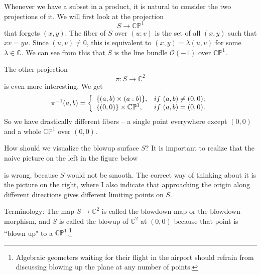 \documentclass[11pt]{article}
\numberwithin{equation}{section}
\numberwithin{footnote}{section}
\newcommand{\blue}{\color{blue}}
\renewcommand{\P}{{\mathbb P}}
\newcommand{\C}{{\mathbb C}}
\begin{document}
Whenever we have a subset in a product, it is natural to consider the two projections of it. We will first look at the projection 
$$
S\to \C\P^1
$$
that forgets $(x,y)$. The fiber of $S$ over $(u:v)$ is the set of all $(x,y)$ such that $xv=yu$. Since $(u,v)\neq 0$, this is 
equivalent to $(x,y) = \lambda (u,v)$ for some $\lambda \in \C$. We can see from this that $S$ is the line bundle $\mathcal O(-1)$ over $\C\P^1$.

\smallskip
The other projection
$$
\pi:S\to\C^2
$$
is even more interesting. We get
$$
\pi^{-1}(a,b) = \left\{\begin{array}{ll}\{(a,b)\times (a:b)\},&{\rm if~}(a,b)\neq (0,0);\\
\{(0,0)\}\times \C\P^1,&{\rm if~}(a,b)=(0,0).\end{array}\right.
$$
So we have drastically different fibers -- a single point everywhere except $(0,0)$ and a whole $\C\P^1$ over $(0,0)$.

\smallskip
How should we visualize the blowup surface $S$? It is important to realize that the naive picture on the left in
the figure below


\noindent
is wrong, because $S$ would not be smooth. The correct way of thinking about it is the picture on the right,
where I also indicate that approaching the origin along different directions gives different limiting points on $S$.


\smallskip
{\blue Terminology:} The map $S\to \C^2$ is called the {\blue blowdown map} or the {\blue blowdown morphism}, and $S$ is called the blowup of $\C^2$ at $(0,0)$ because that point is ``blown up" to a $\C\P^1$.\footnote{ Algebraic geometers waiting for their flight in the airport should refrain from discussing blowing up the plane at any number of points.}
\end{document}
